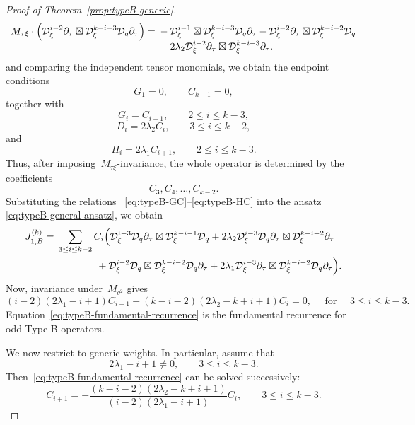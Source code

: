 \documentclass[12pt,a4paper]{amsart}
\theoremstyle{thm}
\theoremstyle{definition}
\newcommand {\Dq}{\cD_q}
\newcommand {\Dxi}{\cD_\xi}
\begin{document}
\begin{proof}[Proof of Theorem~\textup{\ref{prop:typeB-generic}}]
\[
\begin{array}{r@{}l}
M_{\tau\xi}\cdot
\left(
\Dxi^{i-2}\partial_\tau\boxtimes \Dxi^{k-i-3}\Dq\partial_\tau
\right)
={}&
{}-
\Dxi^{i-1}\boxtimes \Dxi^{k-i-3}\Dq\partial_\tau
-
\Dxi^{i-2}\partial_\tau\boxtimes \Dxi^{k-i-2}\Dq
\\
&{}-
2\lambda_2
\Dxi^{i-2}\partial_\tau\boxtimes \Dxi^{k-i-3}\partial_\tau.
\end{array}
\]
and comparing the independent  tensor monomials, we obtain the
endpoint conditions
\[
G_1=0,
\qquad
C_{k-1}=0,
\]
together with
\begin{equation}
G_i=C_{i+1},
\qquad
2\leq i\leq k-3,
\label{eq:typeB-GC}
\end{equation}
\begin{equation}
D_i=2\lambda_2C_i,
\qquad
3\leq i\leq k-2,
\label{eq:typeB-DC}
\end{equation}
and
\begin{equation}
H_i=2\lambda_1C_{i+1},
\qquad
2\leq i\leq k-3.
\label{eq:typeB-HC}
\end{equation}
Thus, after imposing~\(M_{\tau\xi}\)-invariance, the whole operator is
determined by the coefficients
\[
C_3,C_4,\ldots,C_{k-2}.
\]
Substituting the relations~%
\eqref{eq:typeB-GC}--\eqref{eq:typeB-HC} into the ansatz~%
\eqref{eq:typeB-general-ansatz}, we obtain
\begin{align*}
J_{\bar1,B}^{(k)}
={}&
\sum_{3\leq i\leq k-2}
C_i
\Bigl(
\Dxi^{i-3}\Dq\partial_\tau\boxtimes \Dxi^{k-i-1}\Dq
+
2\lambda_2
\Dxi^{i-3}\Dq\partial_\tau\boxtimes \Dxi^{k-i-2}\partial_\tau
\nonumber\\
&\qquad\qquad
+
\Dxi^{i-2}\Dq\boxtimes \Dxi^{k-i-2}\Dq\partial_\tau
+
2\lambda_1
\Dxi^{i-3}\partial_\tau\boxtimes \Dxi^{k-i-2}\Dq\partial_\tau
\Bigr).
\end{align*}
Now, invariance under~\(M_{q^2}\) gives
\begin{equation}
(i-2)(2\lambda_1-i+1)C_{i+1}
+
(k-i-2)(2\lambda_2-k+i+1)C_i
=
0,
\label{eq:typeB-fundamental-recurrence}
\quad \text{ for } \quad
3\leq i\leq k-3.
\end{equation}
Equation~\eqref{eq:typeB-fundamental-recurrence} is the fundamental
recurrence for odd Type B operators.

We now restrict to generic weights. In particular, assume that
\[
2\lambda_1-i+1\neq0,
\qquad
3\leq i\leq k-3.
\]
Then~\eqref{eq:typeB-fundamental-recurrence} can be solved
successively:
\begin{equation}
C_{i+1}
=
-
\frac{
(k-i-2)(2\lambda_2-k+i+1)
}{
(i-2)(2\lambda_1-i+1)
}
C_i,
\qquad
3\leq i\leq k-3.
\label{eq:typeB-recursive-solution}
\end{equation}


\end{proof}
\end{document}
